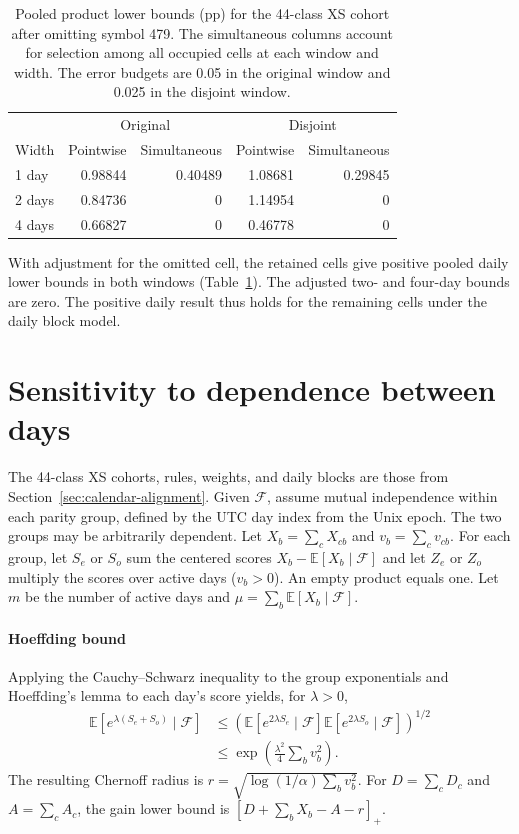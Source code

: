 \documentclass[preprint,11pt]{elsarticle}
\newcommand{\E}{\mathbb E}
\newcommand{\given}{\mathcal F}
\newcommand{\pos}[1]{\left[#1\right]_+}
\begin{document}
\begin{table}[t]
\centering
\small
\caption{Pooled product lower bounds (pp) for the 44-class XS cohort after omitting symbol 479. The simultaneous columns account for selection among all occupied cells at each window and width. The error budgets are 0.05 in the original window and 0.025 in the disjoint window.}
\label{tab:pooled-ablation}
\begin{tabular}{lrrrr}
\toprule
 & \multicolumn{2}{c}{Original} & \multicolumn{2}{c}{Disjoint} \\
Width & Pointwise & Simultaneous & Pointwise & Simultaneous \\
\midrule
1 day & 0.98844 & 0.40489 & 1.08681 & 0.29845 \\
2 days & 0.84736 & 0 & 1.14954 & 0 \\
4 days & 0.66827 & 0 & 0.46778 & 0 \\
\bottomrule
\end{tabular}
\end{table}

With adjustment for the omitted cell, the retained cells give positive pooled daily lower bounds in both windows (Table~\ref{tab:pooled-ablation}). The adjusted two- and four-day bounds are zero. The positive daily result thus holds for the remaining cells under the daily block model.

\FloatBarrier

\section{Sensitivity to dependence between days}
\label{app:daily-dependence}

The 44-class XS cohorts, rules, weights, and daily blocks are those from Section~\ref{sec:calendar-alignment}. Given $\given$, assume mutual independence within each parity group, defined by the UTC day index from the Unix epoch. The two groups may be arbitrarily dependent. Let $X_b=\sum_c X_{cb}$ and $v_b=\sum_c v_{cb}$. For each group, let $S_e$ or $S_o$ sum the centered scores $X_b-\E[X_b\mid\given]$ and let $Z_e$ or $Z_o$ multiply the scores over active days ($v_b>0$). An empty product equals one. Let $m$ be the number of active days and $\mu=\sum_b\E[X_b\mid\given]$.

\paragraph{Hoeffding bound}
Applying the Cauchy--Schwarz inequality to the group exponentials and Hoeffding's lemma to each day's score \cite{janson2004dependent} yields, for $\lambda>0$,
\begin{align*}
\E[e^{\lambda(S_e+S_o)}\mid\given]
&\le \left(\E[e^{2\lambda S_e}\mid\given]\E[e^{2\lambda S_o}\mid\given]\right)^{1/2}\\
&\le \exp\!\left(\frac{\lambda^2}{4}\sum_b v_b^2\right).
\end{align*}
The resulting Chernoff radius is $r=\sqrt{\log(1/\alpha)\sum_b v_b^2}$. For $D=\sum_c D_c$ and $A=\sum_c A_c$, the gain lower bound is $\pos{D+\sum_b X_b-A-r}$.
\end{document}
